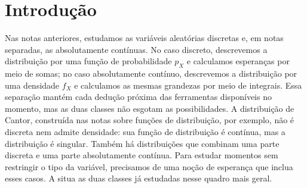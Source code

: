 \documentclass[12pt,portuguese]{article}
\theoremstyle{definition}
\theoremstyle{plainexercise}
\theoremstyle{starredexercise}
\theoremstyle{definition}
\begin{document}
\section{Introdução}\label{sec:introducao}

Nas notas anteriores, estudamos as variáveis aleatórias discretas e, em notas
separadas, as absolutamente contínuas. No caso discreto, descrevemos a
distribuição por uma função de probabilidade $p_X$ e calculamos esperanças por
meio de somas; no caso absolutamente contínuo, descrevemos a distribuição por
uma densidade $f_X$ e calculamos as mesmas grandezas por meio de integrais.
Essa separação mantém cada dedução próxima das ferramentas disponíveis no
momento, mas as duas classes não esgotam as possibilidades. A distribuição
de Cantor, construída nas notas sobre funções de distribuição, por exemplo,
não é discreta nem admite densidade: sua função de distribuição é contínua,
mas a distribuição é singular. Também há distribuições que combinam uma
parte discreta e uma parte absolutamente contínua. Para estudar momentos sem
restringir o tipo da variável, precisamos de uma noção de esperança que
inclua esses casos. A  situa as duas classes já
estudadas nesse quadro mais geral.
\end{document}

